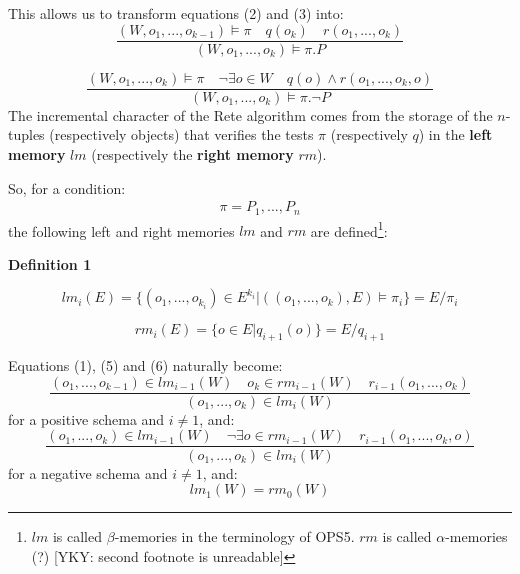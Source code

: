 This allows us to transform equations (2) and (3) into:
\begin{equation}
\frac{(W, o_1, ..., o_{k-1}) \vDash \pi \quad q(o_k) \quad r(o_1, ..., o_k) }
{(W, o_1, ..., o_k) \vDash \pi . P}
\end{equation}

\begin{equation}
\frac{(W, o_1, ..., o_{k}) \vDash \pi \quad \neg \exists o \in W \quad q(o) \wedge r(o_1, ..., o_k, o)}
{(W, o_1, ..., o_k) \vDash \pi . \neg P}
\end{equation}
The incremental character of the Rete algorithm comes from the storage of the $n$-tuples (respectively objects) that verifies the tests $\pi$ (respectively $q$) in the \textbf{left memory} $lm$ (respectively the \textbf{right memory} $rm$).

So, for a condition:
\begin{eqnarray}
\pi = P_1, ..., P_n \nonumber
\end{eqnarray}
the following left and right memories $lm$ and $rm$ are defined\footnote{$lm$ is called $\beta$-memories in the terminology of OPS5. $rm$ is called $\alpha$-memories (?) [YKY: second footnote is unreadable]}:

\textbf{Definition 1}

\begin{equation}
lm_i (E) = \{ (o_1, ..., o_{k_i}) \in E^{k_i} | ((o_1, ..., o_k), E ) \vDash \pi_i \} = E / \pi_i
\nonumber
\end{equation}

\begin{equation}
rm_i (E) = \{ o \in E | q_{i+1}(o) \} = E / q_{i+1}
\nonumber
\end{equation}

Equations (1), (5) and (6) naturally become:
\begin{equation}
\frac{(o_1, ..., o_{k-1}) \in lm_{i-1} (W) \quad o_k \in rm_{i-1} (W) \quad r_{i-1}(o_1, ..., o_k)}
{(o_1, ..., o_k) \in lm_i (W)}
\end{equation}
for a positive schema and $i \neq 1$, and:
\begin{equation}
\frac{(o_1, ..., o_{k}) \in lm_{i-1} (W) \quad \neg \exists o \in rm_{i-1} (W) \quad r_{i-1}(o_1, ..., o_k, o)}
{(o_1, ..., o_k) \in lm_i (W)}
\end{equation}
for a negative schema and $i \neq 1$, and:
\begin{equation}
lm_1 (W) = rm_0 (W)
\end{equation}

